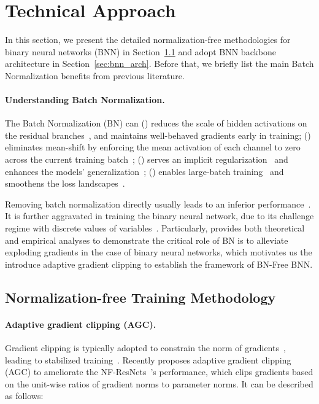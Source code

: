 \documentclass[final]{cvpr}
\begin{document}
\section{Technical Approach}
In this section, we present the detailed normalization-free methodologies for binary neural networks (BNN) in Section~\ref{sec:method_nf} and adopt BNN backbone architecture in Section~\ref{sec:bnn_arch}. Before that, we briefly list the main Batch Normalization benefits from previous literature.

\paragraph{Understanding Batch Normalization.} The Batch Normalization (BN) can () reduces the scale of hidden activations on the residual branches~\cite{de2020batch,balduzzi2017shattered,hanin2018start,yang2019mean}, and maintains well-behaved gradients early in training; () eliminates mean-shift by enforcing the mean activation of each channel to zero across the current training batch~\cite{de2020batch,DBLP,brock2021characterizing}; () serves an implicit regularization~\cite{luo2018towards} and enhances the models' generalization~\cite{hoffer2017train}; () enables large-batch training~\cite{goyal2017accurate} and smoothens the loss landscapes~\cite{santurkar2018does}. 

Removing batch normalization directly usually leads to an inferior performance~\cite{ioffe2015batch,brock2021agc}. It is further aggravated in training the binary neural network, due to its challenge regime with discrete values of variables~\cite{santurkar2018does}. Particularly, \cite{santurkar2018does} provides both theoretical and empirical analyses to demonstrate the critical role of BN is to alleviate exploding gradients in the case of binary neural networks, which motivates us the introduce adaptive gradient clipping to establish the framework of BN-Free BNN.

\subsection{Normalization-free Training Methodology} \label{sec:method_nf}
\paragraph{Adaptive gradient clipping (AGC).} Gradient clipping is typically adopted to constrain the norm of gradients~\cite{pascanu2013difficulty}, leading to stabilized training~\cite{merity2017regularizing}. Recently \cite{brock2021agc} proposes adaptive gradient clipping (AGC) to ameliorate the NF-ResNets~\cite{brock2021characterizing}'s performance, which clips gradients based on the unit-wise ratios of gradient norms to parameter norms. It can be described as follows:
\end{document}
